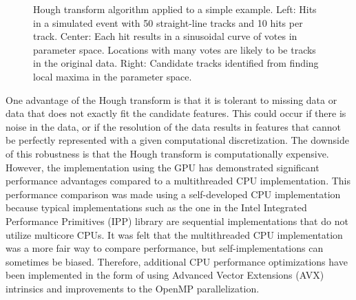 \documentclass[preprint,sort&compress]{elsarticle}
\begin{document}
\begin{figure}[!Hhtb]
\begin{center}
  \caption{Hough transform algorithm applied to a simple example. Left: Hits in a simulated event with 50
    straight-line tracks and 10 hits per track. Center: Each hit results in a sinusoidal curve of votes in parameter
    space. Locations with many votes are likely to be tracks in the original data. Right:
    Candidate tracks identified from finding local maxima in the parameter space.\label{fig:hough}}
\end{center}
\end{figure}

One advantage of the Hough transform is that it is tolerant to missing data or data that does not exactly fit the candidate features.  This could occur if there is noise in the data, or if the resolution of the data results in features that cannot be perfectly represented with a given computational discretization.  The downside of this robustness is that the Hough transform is computationally expensive.  However, the implementation using the GPU has demonstrated significant performance advantages compared to a multithreaded CPU implementation.  This performance comparison was made using a self-developed CPU implementation because typical implementations such as the one in the Intel Integrated Performance Primitives (IPP) library are sequential implementations that do not utilize multicore CPUs.  It was felt that the multithreaded CPU implementation was a more fair way to compare performance, but self-implementations can sometimes be biased.  Therefore, additional CPU performance optimizations have been implemented in the form of using Advanced Vector Extensions (AVX) intrinsics and improvements to the OpenMP parallelization.
\end{document}
